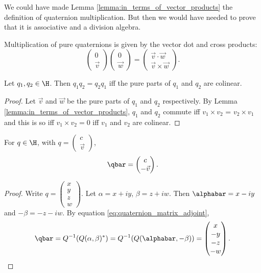 \documentclass[oneside,12pt]{amsart}
\begin{document}
\begin{note}
We could have made Lemma \ref{lemma:in_terms_of_vector_products} the definition of quaternion
multiplication. But then we would have needed to prove that it is associative and
a division algebra.
\end{note}

\begin{corollary}
\label{corollary:pure_mult}
Multiplication of pure quaternions is given by the vector dot and cross products:
$$
\begin{pmatrix}
0\\
\vec{v}
\end{pmatrix}
\begin{pmatrix}
0\\
\vec{w}
\end{pmatrix}
=
\begin{pmatrix}
\vec{v} \cdot \vec{w} \\
\vec{v}\times \vec{w}
\end{pmatrix}.
$$
\end{corollary}

\begin{lemma}
\label{lemma:commute_criterion}
Let $q_1, q_2 \in \H$. Then $q_1 q_2 = q_2 q_1$ iff 
the pure parts of $q_1$ and $q_2$ are colinear.
\end{lemma}
\begin{proof}
Let $\vec{v}$ and $\vec{w}$ be the pure parts of $q_1$ and $q_2$ respectively.
By Lemma \ref{lemma:in_terms_of_vector_products}, $q_1$ and $q_2$ commute
iff $v_1 \times v_2$ = $v_2 \times v_1$ and this is so iff
$v_1 \times v_2 = 0$ iff $v_1$ and $v_2$ are colinear.
\end{proof}

\begin{lemma}
\label{lemma:qbar_for_vectors}
 For $q\in\H$, with $q=\begin{pmatrix}c \\ \vec{v}\end{pmatrix}$,
 $$\qbar = \begin{pmatrix}c \\ -\vec{v}\end{pmatrix}.$$
 \end{lemma}
 \begin{proof}
 Write $q=\begin{pmatrix}x \\ y \\ z \\ w\end{pmatrix}$.
 Let $\alpha = x + iy$, $\beta=z+iw$.
 Then $\alphabar = x - iy$ and $-\beta = -z - iw$.
 By equation \ref{eq:quaternion_matrix_adjoint},
 $$
 \qbar=Q^{-1}(Q(\alpha,\beta)^*)=Q^{-1}(Q(\alphabar,-\beta))=
 \begin{pmatrix}
 x \\ -y \\ -z \\ -w
 \end{pmatrix}.
 $$
 \end{proof}
\end{document}
